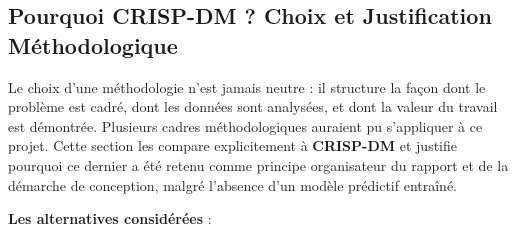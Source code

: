 \documentclass[12pt,a4paper]{report}
\begin{document}
\subsection{Pourquoi CRISP-DM ? Choix et Justification Méthodologique}
\label{sec:pourquoi_crispdm}

Le choix d'une méthodologie n'est jamais neutre : il structure la façon dont le problème est cadré, dont les données sont analysées, et dont la valeur du travail est démontrée. Plusieurs cadres méthodologiques auraient pu s'appliquer à ce projet. Cette section les compare explicitement à \textbf{CRISP-DM} et justifie pourquoi ce dernier a été retenu comme principe organisateur du rapport et de la démarche de conception, malgré l'absence d'un modèle prédictif entraîné.

\textbf{Les alternatives considérées} :
\end{document}
